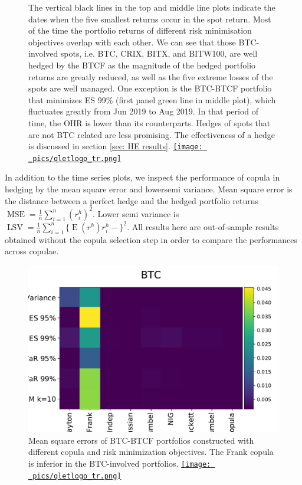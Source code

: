 \begin{figure}[ht]
{            The vertical black lines in the top and middle line plots indicate the dates when the five smallest returns occur in the spot return.
            Most of the time the portfolio returns of different risk minimisation objectives overlap with each other.
            We can see that those BTC-involved spots, i.e. BTC, CRIX, BITX, and BITW100,  are well hedged by the BTCF as the magnitude of the hedged portfolio returns are greatly reduced,
            as well as the five extreme losses of the spots are well managed.
             One exception is the BTC-BTCF portfolio that minimizes ES 99\% (first panel green line in middle plot), which fluctuates greatly from Jun 2019 to Aug 2019.
            In that period of time, the OHR is lower than its counterparts.
            Hedges of spots that are not BTC related are less promising.
            The effectiveness of a hedge is discussed in section \ref{sec: HE results}.
  \href{http://www.quantlet.com/}{\texttt{[image: \_pics/qletlogo\_tr.png]}} }
\label{fig:overview}
\end{figure}

In addition to the time series plots,
we inspect the performance of copula in hedging by the mean square error and lowersemi variance.
Mean square error is the distance between a perfect hedge and the hedged portfolio returns $\operatorname{MSE}=\frac{1}{n}\sum_{i=1}^n(r^h_i)^2$.
Lower semi variance is $\operatorname{LSV}=\frac{1}{n}\sum_{i=1}^n\{\operatorname{E}(r^h)r^h_i-\}^2$.
All results here are out-of-sample results obtained without the copula selection step in order to compare the performances across copulae.  \medskip

\begin{figure}[ht]
    \centering
    \includegraphics[width=\textwidth]{_pics/MSE_BTC.pdf}
  \caption{Mean square errors of BTC-BTCF portfolios constructed with different copula and risk minimization objectives.
    The Frank copula is inferior in the BTC-involved portfolios.
    \href{http://www.quantlet.com/}{\texttt{[image: \_pics/qletlogo\_tr.png]}} }
\label{fig:MSE_BTC}
\end{figure}

